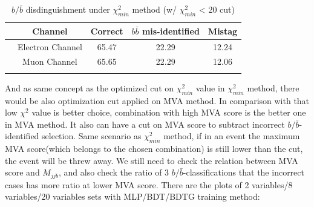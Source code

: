 		\begin{center}
		\begin{longtable}[H]{ c c | c c c }
		\caption{$b/\bar{b}$ disdinguishment under $\chi^2_{min}$ method (w/ $\chi^2_{min}$ < 20 cut)}\\
		\hline
		[\%] & Channel & Correct & $b\bar{b}$ mis-identified & Mistag  \\ 
		\hline{}
		\multirow{2}{2em}{$\chi^2_{min}$} & Electron Channel & 65.47 & 22.29 & 12.24 \\
		& Muon Channel & 65.65 & 22.29 & 12.06 \\
		\hline
		\label{EventSelReco:tb:chi2_algocut_bbsep}
		\end{longtable}
		\end{center}

		And as same concept as the optimized cut on $\chi^2_{min}$ value in $\chi^2_{min}$ method, there would be also optimization cut applied on MVA method. In comparison with that low $\chi^2$ value is better choice, combination with high MVA score is the better one in MVA method. It also can have a cut on MVA score to subtract incorrect $b/\bar{b}$-identified selection. Same scenario as $\chi^2_{min}$ method, if in an event the maximum MVA score(which belongs to the chosen combination) is still lower than the cut, the event will be threw away. We still need to check the relation between MVA score and $M_{jjb}$, and also check the ratio of 3 $b/\bar{b}$-classifications that the incorrect cases has more ratio at lower MVA score. There are the plots of 2 variables/8 variables/20 variables sets with MLP/BDT/BDTG training method:

